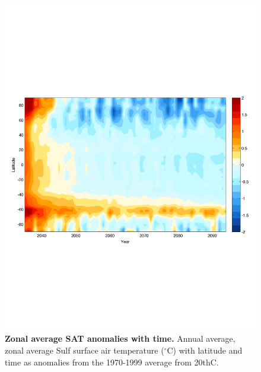 \documentclass{nature}
\begin{document}
\begin{figure}%
\noindent\includegraphics[width=39pc]{figures/SuppFig2.pdf}  %
\caption{\textbf{Zonal average SAT anomalies with time.} Annual average, zonal average Sulf surface air temperature ($^\circ$C) with latitude and time as anomalies from the 1970-1999 average from 20thC.}
\label{fig:supp2}
\end{figure}
\end{document}

